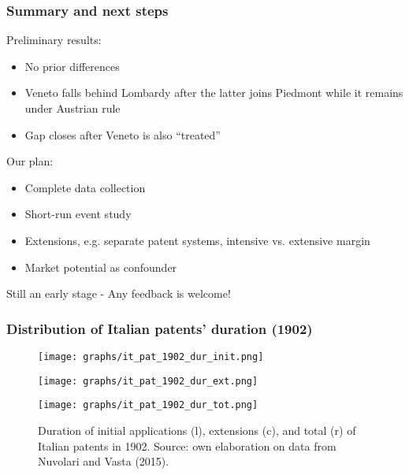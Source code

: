 \documentclass[10pt]{beamer}
\begin{document}
\begin{frame}
    \frametitle{Summary and next steps}

    Preliminary results:
    \begin{itemize}
        \item No prior differences
        \item Veneto falls behind Lombardy after the latter joins Piedmont while it remains under Austrian rule
        \item Gap closes after Veneto is also ``treated''
    \end{itemize}

    
    \bigskip
    
    Our plan:
    \begin{itemize}
        \item Complete data collection
        \item Short-run event study 
        \item Extensions, e.g. separate patent systems, intensive vs. extensive margin
        \item Market potential as confounder
    \end{itemize}
  
    \bigskip
    
    Still an early stage - Any feedback is welcome!

\end{frame}

\appendix

\begin{frame}[label = duration]
    \frametitle{Distribution of Italian patents' duration (1902)}

\begin{figure}[h]
    \centering
    \begin{minipage}{0.32\textwidth}
        \centering
        \texttt{[image: graphs/it\_pat\_1902\_dur\_init.png]}
        \label{fig:figure1}
    \end{minipage}\hfill
    \begin{minipage}{0.32\textwidth}
        \centering
        \texttt{[image: graphs/it\_pat\_1902\_dur\_ext.png]}
        \label{fig:figure2}
    \end{minipage}\hfill
    \begin{minipage}{0.32\textwidth}
        \centering
        \texttt{[image: graphs/it\_pat\_1902\_dur\_tot.png]}
        \label{fig:figure3}
    \end{minipage}
    \caption{Duration of initial applications (l), extensions (c), and total (r) of Italian patents in 1902. Source: own elaboration on data from Nuvolari and Vasta (2015).}


\end{figure}

\hyperlink{patent_fees}{}
    
\end{frame}

\end{document}
